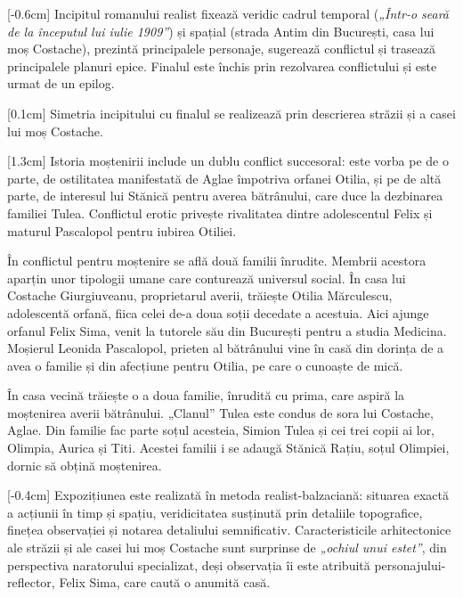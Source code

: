 [-0.6cm]
Incipitul romanului realist fixează veridic cadrul temporal (\textit{„Într-o seară de la începutul lui iulie 1909”}) și spațial (strada Antim din București, casa lui moș Costache), prezintă principalele personaje, sugerează conflictul și trasează principalele planuri epice. Finalul este închis prin rezolvarea conflictului și este urmat de un epilog.

[0.1cm]
Simetria incipitului cu finalul se realizează prin descrierea străzii și a casei lui moș Costache.

[1.3cm]
Istoria moștenirii include un dublu conflict succesoral: este vorba pe de o parte, de ostilitatea manifestată de Aglae împotriva orfanei Otilia, și pe de altă parte, de interesul lui Stănică pentru averea bătrânului, care duce la dezbinarea familiei Tulea. Conflictul erotic privește rivalitatea dintre adolescentul Felix și maturul Pascalopol pentru iubirea Otiliei.

În conflictul pentru moștenire se află două familii înrudite. Membrii acestora aparțin unor tipologii umane care conturează universul social. În casa lui Costache Giurgiuveanu, proprietarul averii, trăiește Otilia Mărculescu, adolescentă orfană, fiica celei de-a doua soții decedate a acestuia. Aici ajunge orfanul Felix Sima, venit la tutorele său din București pentru a studia Medicina. Moșierul Leonida Pascalopol, prieten al bătrânului vine în casă din dorința de a avea o familie și din afecțiune pentru Otilia, pe care o cunoaște de mică.

În casa vecină trăiește o a doua familie, înrudită cu prima, care aspiră la moștenirea averii bătrânului. „Clanul” Tulea este condus de sora lui Costache, Aglae. Din familie fac parte soțul acesteia, Simion Tulea și cei trei copii ai lor, Olimpia, Aurica și Titi. Acestei familii i se adaugă Stănică Rațiu, soțul Olimpiei, dornic să obțină moștenirea.

[-0.4cm]
Expozițiunea este realizată în metoda realist-balzaciană: situarea exactă a acțiunii în timp și spațiu, veridicitatea susținută prin detaliile topografice, finețea observației și notarea detaliului semnificativ. Caracteristicile arhitectonice ale străzii și ale casei lui moș Costache sunt surprinse de \textit{„ochiul unui estet”}, din perspectiva naratorului specializat, deși observația îi este atribuită personajului-reflector, Felix Sima, care caută o anumită casă.

